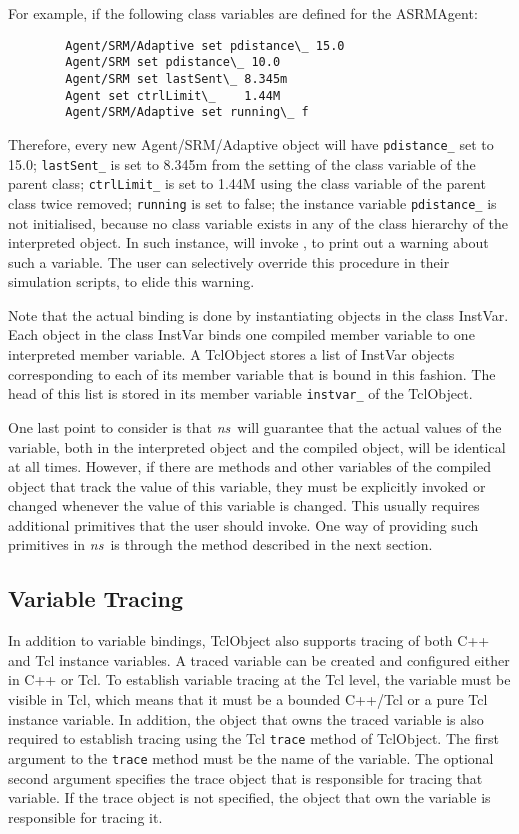For example, if the following class variables are defined for the ASRMAgent:
\begin{verbatim}
        Agent/SRM/Adaptive set pdistance\_ 15.0
        Agent/SRM set pdistance\_ 10.0
        Agent/SRM set lastSent\_ 8.345m
        Agent set ctrlLimit\_    1.44M
        Agent/SRM/Adaptive set running\_ f
\end{verbatim}
Therefore, every new Agent/SRM/Adaptive object will have
{\tt pdistance\_} set to 15.0;
{\tt lastSent\_} is set to 8.345m
from the setting of the class variable of the parent class;
{\tt ctrlLimit\_} is set to 1.44M
using the class variable of the parent class twice removed;
{\tt running} is set to false;
the instance variable {\tt pdistance\_} is not initialised,
because no class variable
exists in any of the class hierarchy of the interpreted object.
In such instance,  will invoke 
, to print out a warning about such a variable.
The user can selectively override this procedure
in their simulation scripts, to elide this warning.

Note that the actual binding
is done by instantiating objects in the class InstVar.
Each object in the class InstVar binds 
one compiled member variable to one interpreted member variable.
A TclObject stores a list of InstVar objects corresponding
to each of its member variable that is bound in this fashion.
The head of this list is stored in its member variable
{\tt instvar\_} of the TclObject.

One last point to consider is that
\emph{ns}\ will guarantee that the actual values
of the variable, both in the interpreted object and the compiled object,
will be identical at all times.
However, if there are methods and other variables
of the compiled object that track the value of this variable,
they must be explicitly invoked or changed whenever the
value of this variable is changed.
This usually requires additional primitives that the user should invoke.
One way of providing such primitives in \emph{ns}\ is through
the  method described in the next section.


\subsection{Variable Tracing}
\label{sec:VarTrace}

In addition to variable bindings, TclObject also supports tracing of
both C++ and Tcl instance variables.  A traced variable can be created
and configured either in C++ or Tcl.  To establish variable tracing at
the Tcl level, the variable must be visible in Tcl, which means that it
must be a bounded C++/Tcl or a pure Tcl instance variable.  In addition,
the object that owns the traced variable is also required to establish
tracing using the Tcl {\tt trace} method of TclObject.  The first
argument to the {\tt trace} method must be the name of the variable.
The optional second argument specifies the trace object that is
responsible for tracing that variable.  If the trace object is not
specified, the object that own the variable is responsible for tracing
it.

